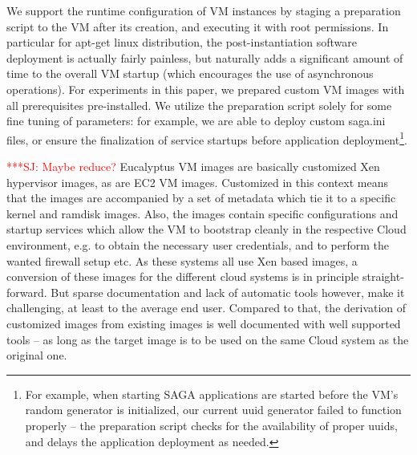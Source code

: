 \documentclass[3p,twocolumn]{elsarticle}
\newcommand{\jhanote}[1]{ {\textcolor{red} { ***SJ: #1 }}}
\newcommand{\jhanote}[1]{}
\begin{document}
We support the runtime configuration of VM instances by staging a
preparation script to the VM after its creation, and executing it with
root permissions.  In particular for apt-get linux distribution, the
post-instantiation software deployment is actually fairly painless,
but naturally adds a significant amount of time to the overall VM
startup (which encourages the use of asynchronous operations).
For experiments in this paper, we prepared custom VM images with all
prerequisites pre-installed.  We utilize the preparation script solely
for some fine tuning of parameters: for example, we are able to deploy
custom saga.ini files, or ensure the finalization of service startups
before application deployment\footnote{For example, when starting SAGA
  applications are started before the VM's random generator is
  initialized, our current uuid generator failed to function properly
  -- the preparation script checks for the availability of proper
  uuids, and delays the application deployment as needed.}.

\jhanote{Maybe reduce?} Eucalyptus VM images are basically customized
Xen hypervisor images, as are EC2 VM images.  Customized in this
context means that the images are accompanied by a set of metadata
which tie it to a specific kernel and ramdisk images.  Also, the
images contain specific configurations and startup services which
allow the VM to bootstrap cleanly in the respective Cloud environment,
e.g. to obtain the necessary user credentials, and to perform the
wanted firewall setup etc.  As these systems all use Xen based images,
a conversion of these images for the different cloud systems is in
principle straight-forward.  But sparse documentation and lack of
automatic tools however, make it challenging, at least to the average
end user. Compared to that, the derivation of customized images from
existing images is well documented with well supported tools -- as
long as the target image is to be used on the same Cloud system as the
original one.
\end{document}
